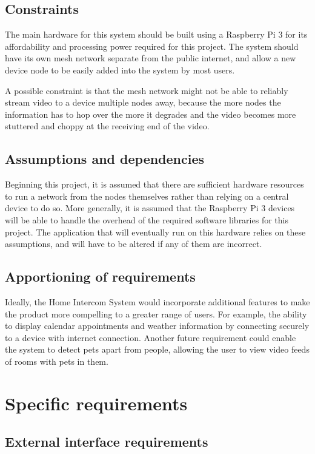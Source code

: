 \documentclass[onecolumn, draftclsnofoot,10pt, compsoc]{IEEEtran}
\begin{document}
\subsection{Constraints}
The main hardware for this system should be built using a Raspberry Pi 3 for its affordability and processing power required for this project. The system should have its own mesh network separate from the public internet, and allow a new device node to be easily added into the system by most users.

\noindent A possible constraint is that the mesh network might not be able to reliably stream video to a device multiple nodes away, because the more nodes the information has to hop over the more it degrades and the video becomes more stuttered and choppy at the receiving end of the video.

\subsection{Assumptions and dependencies}
Beginning this project, it is assumed that there are sufficient hardware resources to run a network from the nodes themselves rather than relying on a central device to do so. More generally, it is assumed that the Raspberry Pi 3 devices will be able to handle the overhead of the required software libraries for this project. The application that will eventually run on this hardware relies on these assumptions, and will have to be altered if any of them are incorrect. 

\subsection{Apportioning of requirements}
Ideally, the Home Intercom System would incorporate additional features to make the product more compelling to a greater range of users. For example, the ability to display calendar appointments and weather information by connecting securely to a device with internet connection. Another future requirement could enable the system to detect pets apart from people, allowing the user to view video feeds of rooms with pets in them. 

\section{Specific requirements}

\subsection{External interface requirements}
\end{document}
